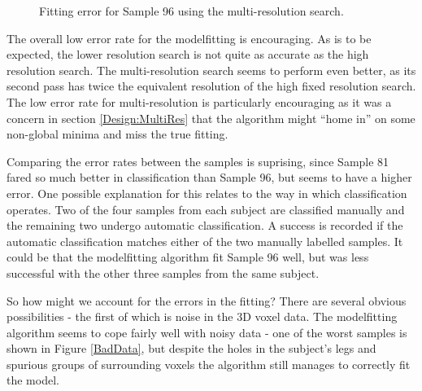 \begin{figure}[p]
        \quad

        \caption{Fitting error for Sample 96 using the multi-resolution search.}
        \label{ManualFit96:multires}
\end{figure}

The overall low error rate for the modelfitting is encouraging.
As is to be expected, the lower resolution search is not quite as accurate as the high resolution search.
The multi-resolution search seems to perform even better, as its second pass has twice the equivalent resolution of the high fixed resolution search.
The low error rate for multi-resolution is particularly encouraging as it was a concern in section \ref{Design:MultiRes} that the algorithm might ``home in'' on some non-global minima and miss the true fitting.

Comparing the error rates between the samples is suprising, since Sample 81 fared so much better in classification than Sample 96, but seems to have a higher error.
One possible explanation for this relates to the way in which classification operates.
Two of the four samples from each subject are classified manually and the remaining two undergo automatic classification.
A success is recorded if the automatic classification matches either of the two manually labelled samples.
It could be that the modelfitting algorithm fit Sample 96 well, but was less successful with the other three samples from the same subject.

\bigskip
\noindent So how might we account for the errors in the fitting?
There are several obvious possibilities - the first of which is noise in the 3D voxel data.
The modelfitting algorithm seems to cope fairly well with noisy data - one of the worst samples is shown in Figure \ref{BadData}, but despite the holes in the subject's legs and spurious groups of surrounding voxels the algorithm still manages to correctly fit the model.

